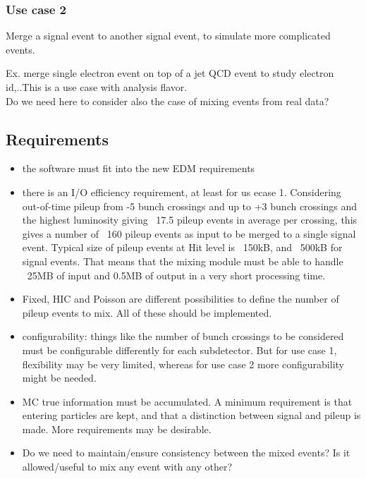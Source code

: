 \documentclass[draftmode]{memarticle}
\begin{document}
\subsubsection {Use case 2}

Merge a signal event to another signal event, to simulate more complicated events.

Ex. merge single electron event on top of a jet QCD event to study electron id,..This is a use case with analysis flavor. \\
Do we need here to consider also the case of mixing events from real data?

\subsection {Requirements}
\begin {itemize}
\item
the software must fit into the new EDM requirements

\item
there is an I/O efficiency requirement, at least for us ecase 1. Considering out-of-time pileup from -5 bunch crossings and up to +3 bunch crossings and the highest luminosity giving ~17.5 pileup events in average per crossing, this gives a number of ~160 pileup events as input to be merged to a single signal event. Typical size of pileup events at Hit level is ~150kB, and ~500kB for signal events.
That means that the mixing module must be able to handle ~25MB of input and 0.5MB of output in a 
very short processing time.
\item
Fixed, HIC and Poisson are different possibilities to define the number of pileup events to mix. All of these should be implemented.
\item
configurability: things like the number of bunch crossings to be considered must be configurable differently for each subdetector. But for use case 1, flexibility may be very limited, whereas for use case 2 more configurability might be needed.
\item
MC true information must be accumulated. A minimum requirement is that entering particles are kept, and that a distinction between signal and pileup is made.  More requirements may be desirable.

\item
Do we need to maintain/ensure consistency between the mixed events? Is it allowed/useful to mix any event with any other?

\end {itemize}
\end{document}
